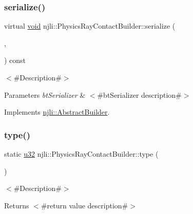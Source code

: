 \subsubsection{\texorpdfstring{serialize()}{serialize()}}
{\footnotesize\ttfamily virtual \mbox{\hyperlink{_thread_8h_af1e856da2e658414cb2456cb6f7ebc66}{void}} njli\+::\+Physics\+Ray\+Contact\+Builder\+::serialize (\begin{DoxyParamCaption}\item[{\mbox{\hyperlink{_thread_8h_af1e856da2e658414cb2456cb6f7ebc66}{void}} $\ast$}]{,  }\item[{bt\+Serializer $\ast$}]{ }\end{DoxyParamCaption}) const\hspace{0.3cm}{\ttfamily [virtual]}}

$<$\#\+Description\#$>$


\begin{DoxyParams}{Parameters}
{\em bt\+Serializer} & $<$\#bt\+Serializer description\#$>$ \\
\hline
\end{DoxyParams}


Implements \mbox{\hyperlink{classnjli_1_1_abstract_builder_ab66b774e02ccb9da554c9aab7fa6d981}{njli\+::\+Abstract\+Builder}}.

\mbox{\label{classnjli_1_1_physics_ray_contact_builder_aa6edc3d5013e98be7572fd4e8d1d1af4}} 
\subsubsection{\texorpdfstring{type()}{type()}}
{\footnotesize\ttfamily static \mbox{\hyperlink{_util_8h_a10e94b422ef0c20dcdec20d31a1f5049}{u32}} njli\+::\+Physics\+Ray\+Contact\+Builder\+::type (\begin{DoxyParamCaption}{ }\end{DoxyParamCaption})\hspace{0.3cm}{\ttfamily [static]}}

$<$\#\+Description\#$>$

\begin{DoxyReturn}{Returns}
$<$\#return value description\#$>$ 
\end{DoxyReturn}


